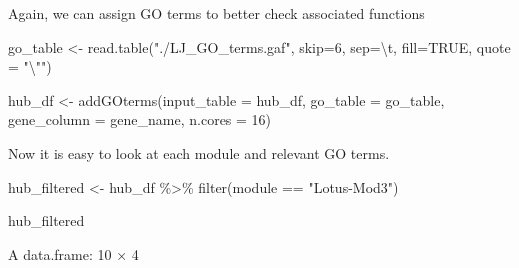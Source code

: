 \documentclass[
  letterpaper,
  DIV=11,
  numbers=noendperiod]{scrartcl}
\newenvironment{Shaded}{\begin{snugshade}}{\end{snugshade}}
\newcommand{\AttributeTok}[1]{\textcolor[rgb]{0.40,0.45,0.13}{#1}}
\newcommand{\ConstantTok}[1]{\textcolor[rgb]{0.56,0.35,0.01}{#1}}
\newcommand{\DecValTok}[1]{\textcolor[rgb]{0.68,0.00,0.00}{#1}}
\newcommand{\FunctionTok}[1]{\textcolor[rgb]{0.28,0.35,0.67}{#1}}
\newcommand{\NormalTok}[1]{\textcolor[rgb]{0.00,0.23,0.31}{#1}}
\newcommand{\OtherTok}[1]{\textcolor[rgb]{0.00,0.23,0.31}{#1}}
\newcommand{\SpecialCharTok}[1]{\textcolor[rgb]{0.37,0.37,0.37}{#1}}
\newcommand{\StringTok}[1]{\textcolor[rgb]{0.13,0.47,0.30}{#1}}
\begin{document}
Again, we can assign GO terms to better check associated functions

\begin{Shaded}
\begin{Highlighting}[]
\NormalTok{go\_table }\OtherTok{\textless{}{-}} \FunctionTok{read.table}\NormalTok{(}\StringTok{"./LJ\_GO\_terms.gaf"}\NormalTok{, }\AttributeTok{skip=}\DecValTok{6}\NormalTok{, }\AttributeTok{sep=}\StringTok{\textquotesingle{}}\SpecialCharTok{\textbackslash{}t}\StringTok{\textquotesingle{}}\NormalTok{, }\AttributeTok{fill=}\ConstantTok{TRUE}\NormalTok{, }\AttributeTok{quote =} \StringTok{"}\SpecialCharTok{\textbackslash{}"}\StringTok{"}\NormalTok{)}
\end{Highlighting}
\end{Shaded}

\begin{Shaded}
\begin{Highlighting}[]
\NormalTok{hub\_df }\OtherTok{\textless{}{-}} \FunctionTok{addGOterms}\NormalTok{(}\AttributeTok{input\_table =}\NormalTok{ hub\_df, }
                     \AttributeTok{go\_table =}\NormalTok{ go\_table, }
                     \AttributeTok{gene\_column =} \StringTok{\textquotesingle{}gene\_name\textquotesingle{}}\NormalTok{,}
                     \AttributeTok{n.cores =} \DecValTok{16}\NormalTok{)}
\end{Highlighting}
\end{Shaded}

Now it is easy to look at each module and relevant GO terms.

\begin{Shaded}
\begin{Highlighting}[]
\NormalTok{hub\_filtered }\OtherTok{\textless{}{-}}\NormalTok{ hub\_df }\SpecialCharTok{\%\textgreater{}\%} \FunctionTok{filter}\NormalTok{(module }\SpecialCharTok{==} \StringTok{"Lotus{-}Mod3"}\NormalTok{)}
\end{Highlighting}
\end{Shaded}

\begin{Shaded}
\begin{Highlighting}[]
\NormalTok{hub\_filtered}
\end{Highlighting}
\end{Shaded}

A data.frame: 10 × 4
\end{document}
